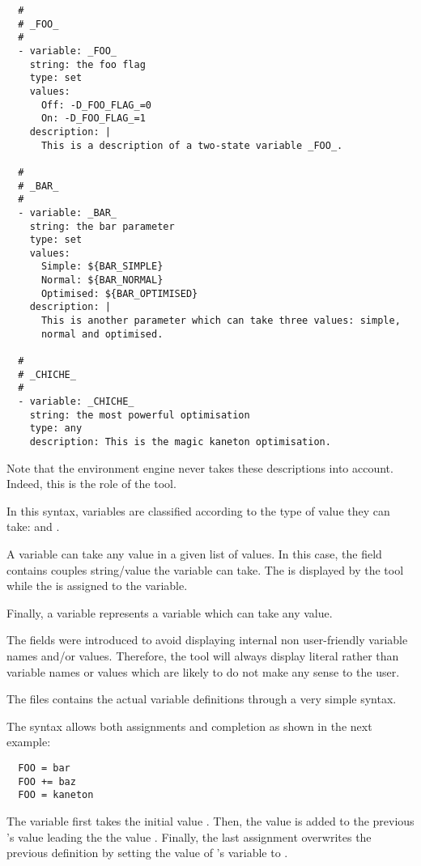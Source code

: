 \begin{verbatim}
  #
  # _FOO_
  #
  - variable: _FOO_
    string: the foo flag
    type: set
    values:
      Off: -D_FOO_FLAG_=0
      On: -D_FOO_FLAG_=1
    description: |
      This is a description of a two-state variable _FOO_.

  #
  # _BAR_
  #
  - variable: _BAR_
    string: the bar parameter
    type: set
    values:
      Simple: ${BAR_SIMPLE}
      Normal: ${BAR_NORMAL}
      Optimised: ${BAR_OPTIMISED}
    description: |
      This is another parameter which can take three values: simple,
      normal and optimised.

  #
  # _CHICHE_
  #
  - variable: _CHICHE_
    string: the most powerful optimisation
    type: any
    description: This is the magic kaneton optimisation.
\end{verbatim}

Note that the environment engine never takes these descriptions into account.
Indeed, this is the role of the  tool.

In this syntax, variables are classified according to the type of value
they can take:  and .

A  variable can take any value in a given list of values. In
this case, the  field contains couples string/value the
variable can take. The  is displayed by the 
tool while the  is assigned to the variable.

Finally, a  variable represents a variable which can take any
value.

The  fields were introduced to avoid displaying internal
non user-friendly variable names and/or values. Therefore, the
 tool will always display literal 
rather than variable names or values which are likely to do not make any
sense to the user.



The  files contains the actual variable definitions
through a very simple syntax.

The syntax allows both assignments and completion as shown in the next example:

\begin{verbatim}
  FOO = bar
  FOO += baz
  FOO = kaneton
\end{verbatim}

The  variable first takes the initial value . Then,
the value  is added to the previous 's value
leading the the value . Finally, the last assignment
overwrites the previous definition by setting the value of 's
variable to .

